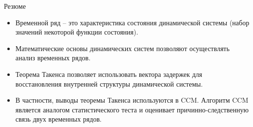 \begin{frame}{Резюме}
\begin{itemize}
    \item Временной ряд -- это характеристика состояния динамической системы (набор значений некоторой функции состояния).
    \item Математические основы динамических систем позволяют осуществлять анализ временных рядов.
    \item Теорема Такенса позволяет использовать вектора задержек для восстановления внутренней структуры динамической системы.
    \item В частности, выводы теоремы Такенса используются в CCM. Алгоритм CCM является аналогом статистического теста и оценивает причинно-следственную связь двух временных рядов.
\end{itemize}
\end{frame}
 
